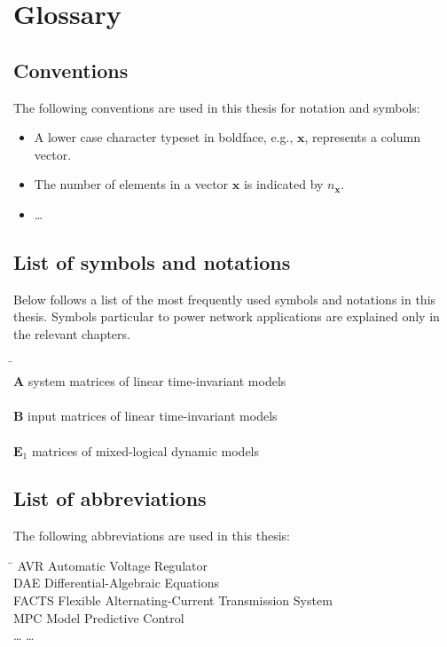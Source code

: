 \chapter*{Glossary}

\graphicspath{{./ch-x-others/images/}}


\section*{Conventions}
The following conventions are used in this thesis for notation
and symbols:
\begin{itemize}
\item A lower case character typeset in boldface, e.g., $\mathbf{x}$,
   represents a column vector.
\item The number of elements in a vector $\mathbf{x}$ is indicated by
   $n_{\mathbf{x}}$.
\item \ldots
\end{itemize}

\section*{List of symbols and notations}
Below follows a list of the most frequently used symbols and notations
in this thesis. Symbols particular to power network applications
are explained only in the relevant chapters.

\vspace*{-0.4cm}\begin{tabbing}
\hspace*{3.5cm}\=\kill\\
$ \mathbf{A}  $ \> system matrices of linear time-invariant models \\
\\[-0.1cm]
$ \mathbf{B}  $ \> input matrices of linear time-invariant models \\
\\[-0.1cm]
$ \mathbf{E}_1 $ \> matrices of mixed-logical dynamic models \\
\end{tabbing}

\vspace*{-0.7cm}
\section*{List of abbreviations}
The following abbreviations are used in this thesis:
\begin{tabbing}
\hspace*{4cm}\=\kill
AVR \> Automatic Voltage Regulator\\
DAE \> Differential-Algebraic Equations\\
FACTS \> Flexible Alternating-Current Transmission System\\
MPC \> Model Predictive Control\\
\ldots \> \ldots
\end{tabbing}
